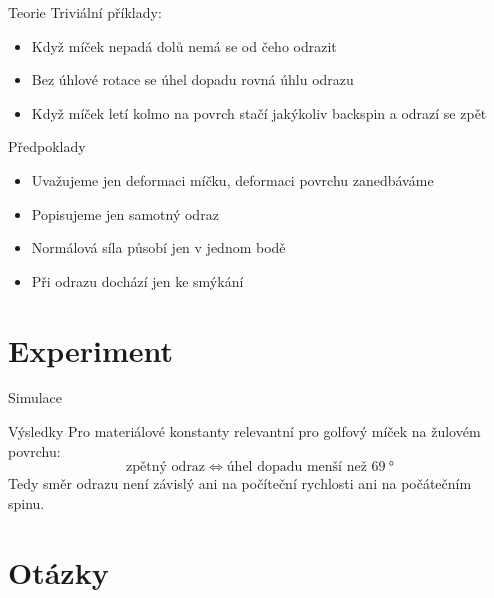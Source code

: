 \documentclass[secheader]{beamer}
\begin{document}
 \begin{frame}{Teorie}
  Triviální příklady:
  \begin{itemize}
   \item Když míček nepadá dolů nemá se od čeho odrazit 
   \item Bez úhlové rotace se úhel dopadu rovná úhlu odrazu
   \item Když míček letí kolmo na povrch stačí jakýkoliv backspin a odrazí se
    zpět
  \end{itemize}
 \end{frame}

 \begin{frame}{Předpoklady}
 \begin{itemize}
  \item Uvažujeme jen deformaci míčku, deformaci povrchu zanedbáváme
  \item Popisujeme jen samotný odraz
  \item Normálová síla působí jen v jednom bodě
  \item Při odrazu dochází jen ke smýkání 
 \end{itemize}
\end{frame}

\section{Experiment}

\begin{frame}{Simulace}
 \centering

\end{frame}

 \begin{frame}{Výsledky}
 Pro materiálové konstanty relevantní pro golfový míček na žulovém povrchu:
 \[
  \text{zpětný odraz} \Longleftrightarrow \text{úhel dopadu menší než }\qty{69}{\degree}
 \]
 Tedy směr odrazu není závislý ani na počíteční rychlosti ani na počátečním
 spinu.
\end{frame}

\section{Otázky}
\end{document}
